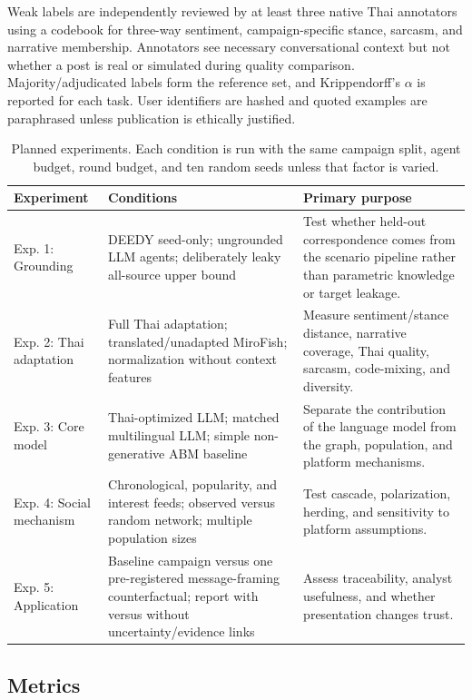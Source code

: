 \documentclass[conference]{IEEEtran}
\begin{document}
Weak labels are independently reviewed by at least three native Thai
annotators using a codebook for three-way sentiment, campaign-specific stance,
sarcasm, and narrative membership. Annotators see necessary conversational
context but not whether a post is real or simulated during quality comparison.
Majority/adjudicated labels form the reference set, and Krippendorff's
$\alpha$ is reported for each task. User identifiers are hashed and quoted
examples are paraphrased unless publication is ethically justified.

\begin{table}[t]
\caption{Planned experiments. Each condition is run with the same campaign
split, agent budget, round budget, and ten random seeds unless that factor is
varied.}
\label{tab:experiments}
\centering
\footnotesize
\begin{tabular}{@{}p{}p{}p{}@{}}
\toprule
Experiment & Conditions & Primary purpose \\
\midrule
Exp. 1: Grounding & DEEDY seed-only; ungrounded LLM agents; deliberately leaky
all-source upper bound & Test whether held-out correspondence comes from the
scenario pipeline rather than parametric knowledge or target leakage. \\
Exp. 2: Thai adaptation & Full Thai adaptation; translated/unadapted MiroFish;
normalization without context features & Measure sentiment/stance distance,
narrative coverage, Thai quality, sarcasm, code-mixing, and diversity. \\
Exp. 3: Core model & Thai-optimized LLM; matched multilingual LLM; simple
non-generative ABM baseline & Separate the contribution of the language model
from the graph, population, and platform mechanisms. \\
Exp. 4: Social mechanism & Chronological, popularity, and interest feeds;
observed versus random network; multiple population sizes & Test cascade,
polarization, herding, and sensitivity to platform assumptions. \\
Exp. 5: Application & Baseline campaign versus one pre-registered
message-framing
counterfactual; report with versus without uncertainty/evidence links & Assess
traceability, analyst usefulness, and whether presentation changes trust. \\
\bottomrule
\end{tabular}
\end{table}

\subsection{Metrics}
\end{document}
